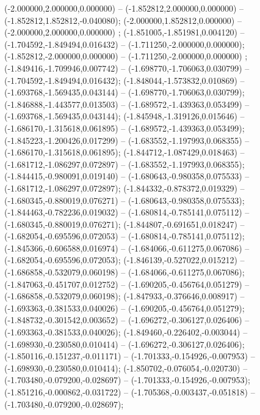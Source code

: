  (-2.000000,2.000000,0.000000) -- (-1.852812,2.000000,0.000000) -- (-1.852812,1.852812,-0.040080);
 (-2.000000,1.852812,0.000000) -- (-2.000000,2.000000,0.000000) ;
 (-1.851005,-1.851981,0.004120) -- (-1.704592,-1.849494,0.016432) -- (-1.711250,-2.000000,0.000000);
 (-1.852812,-2.000000,0.000000) -- (-1.711250,-2.000000,0.000000) ;
 (-1.849416,-1.709946,0.007742) -- (-1.698770,-1.706063,0.030799) -- (-1.704592,-1.849494,0.016432);
 (-1.848044,-1.573832,0.010869) -- (-1.693768,-1.569435,0.043144) -- (-1.698770,-1.706063,0.030799);
 (-1.846888,-1.443577,0.013503) -- (-1.689572,-1.439363,0.053499) -- (-1.693768,-1.569435,0.043144);
 (-1.845948,-1.319126,0.015646) -- (-1.686170,-1.315618,0.061895) -- (-1.689572,-1.439363,0.053499);
 (-1.845223,-1.200426,0.017299) -- (-1.683552,-1.197993,0.068355) -- (-1.686170,-1.315618,0.061895);
 (-1.844712,-1.087429,0.018463) -- (-1.681712,-1.086297,0.072897) -- (-1.683552,-1.197993,0.068355);
 (-1.844415,-0.980091,0.019140) -- (-1.680643,-0.980358,0.075533) -- (-1.681712,-1.086297,0.072897);
 (-1.844332,-0.878372,0.019329) -- (-1.680345,-0.880019,0.076271) -- (-1.680643,-0.980358,0.075533);
 (-1.844463,-0.782236,0.019032) -- (-1.680814,-0.785141,0.075112) -- (-1.680345,-0.880019,0.076271);
 (-1.844807,-0.691651,0.018247) -- (-1.682054,-0.695596,0.072053) -- (-1.680814,-0.785141,0.075112);
 (-1.845366,-0.606588,0.016974) -- (-1.684066,-0.611275,0.067086) -- (-1.682054,-0.695596,0.072053);
 (-1.846139,-0.527022,0.015212) -- (-1.686858,-0.532079,0.060198) -- (-1.684066,-0.611275,0.067086);
 (-1.847063,-0.451707,0.012752) -- (-1.690205,-0.456764,0.051279) -- (-1.686858,-0.532079,0.060198);
 (-1.847933,-0.376646,0.008917) -- (-1.693363,-0.381533,0.040026) -- (-1.690205,-0.456764,0.051279);
 (-1.848732,-0.301542,0.003652) -- (-1.696272,-0.306127,0.026406) -- (-1.693363,-0.381533,0.040026);
 (-1.849460,-0.226402,-0.003044) -- (-1.698930,-0.230580,0.010414) -- (-1.696272,-0.306127,0.026406);
 (-1.850116,-0.151237,-0.011171) -- (-1.701333,-0.154926,-0.007953) -- (-1.698930,-0.230580,0.010414);
 (-1.850702,-0.076054,-0.020730) -- (-1.703480,-0.079200,-0.028697) -- (-1.701333,-0.154926,-0.007953);
 (-1.851216,-0.000862,-0.031722) -- (-1.705368,-0.003437,-0.051818) -- (-1.703480,-0.079200,-0.028697);
